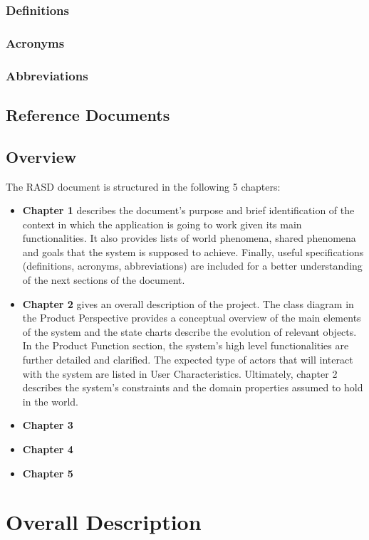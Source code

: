 \documentclass{article}
\begin{document}
\subsubsection{Definitions}
\subsubsection{Acronyms}
\subsubsection{Abbreviations}

\subsection{Reference Documents}
\subsection{Overview}
The RASD document is structured in the following 5 chapters:
\begin{itemize}
\item\textbf{Chapter 1} describes the document’s purpose and brief identification of the context in which the application is going to work given its main functionalities. It also provides lists of world phenomena, shared phenomena and goals that the system is supposed to achieve. Finally, useful specifications (definitions, acronyms, abbreviations) are included for a better understanding of the next sections of the document.
\item\textbf{Chapter 2} gives an overall description of the project. The class diagram in the Product Perspective provides a conceptual overview of the main elements of the system and the state charts describe the evolution of relevant objects. In the Product Function section, the system’s high level functionalities are further detailed and clarified. The expected type of actors that will interact with the system are listed in User Characteristics. Ultimately, chapter 2 describes the system’s constraints and the domain properties assumed to hold in the world.
\item\textbf{Chapter 3}
\item\textbf{Chapter 4}
\item\textbf{Chapter 5}
\end{itemize}


\section{Overall Description}
\end{document}
